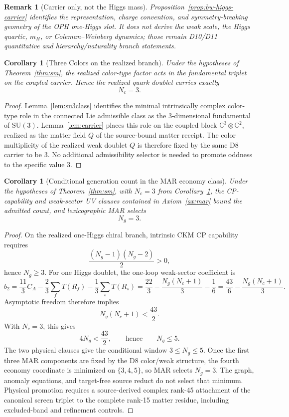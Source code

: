 \documentclass[11pt]{article}
\newtheorem{corollary}[theorem]{Corollary}
\newtheorem{remark}[theorem]{Remark}
\newcommand{\SU}{\mathrm{SU}}
\begin{document}
\begin{remark}[Carrier only, not the Higgs mass]
Proposition~\ref{prop:bw-higgs-carrier} identifies the representation, charge convention, and symmetry-breaking geometry of the OPH one-Higgs slot. It does not derive the weak scale, the Higgs quartic, \(m_H\), or Coleman--Weinberg dynamics; those remain D10/D11 quantitative and hierarchy/naturality branch statements.
\end{remark}

\begin{corollary}[Three Colors on the realized branch]\label{cor:nc}
Under the hypotheses of Theorem~\ref{thm:sm}, the realized color-type factor acts in the fundamental triplet on the coupled carrier. Hence the realized quark doublet carries exactly
\[
N_c=3.
\]
\end{corollary}

\begin{proof}
Lemma~\ref{lem:su3class} identifies the minimal intrinsically complex color-type role in the connected Lie admissible class as the \(3\)-dimensional fundamental of \(\SU(3)\). Lemma~\ref{lem:carrier} places this role on the coupled block \(\mathbb C^3\otimes\mathbb C^2\), realized as the matter field \(Q\) of the source-bound matter receipt. The color multiplicity of the realized weak doublet \(Q\) is therefore fixed by the same D8 carrier to be \(3\). No additional admissibility selector is needed to promote oddness to the specific value \(3\).
\end{proof}

\begin{corollary}[Conditional generation count in the MAR economy class]\label{cor:ng}
Under the hypotheses of Theorem~\ref{thm:sm}, with \(N_c=3\) from Corollary~\ref{cor:nc}, the CP-capability and weak-sector UV clauses contained in Axiom~\ref{ax:mar} bound the admitted count, and lexicographic MAR selects
\[
N_g=3.
\]
\end{corollary}

\begin{proof}
On the realized one-Higgs chiral branch, intrinsic CKM CP capability requires
\[
\frac{(N_g-1)(N_g-2)}{2}>0,
\]
hence $N_g\ge 3$. For one Higgs doublet, the one-loop weak-sector coefficient is
\[
b_2=\frac{11}{3}C_A-\frac{2}{3}\sum_f T(R_f)-\frac{1}{3}\sum_s T(R_s)
=
\frac{22}{3}-\frac{N_g(N_c+1)}{3}-\frac16
=
\frac{43}{6}-\frac{N_g(N_c+1)}{3}.
\]
Asymptotic freedom therefore implies
\[
N_g(N_c+1)<\frac{43}{2}.
\]
With \(N_c=3\), this gives
\[
4N_g<\frac{43}{2},
\qquad\text{hence}\qquad
N_g\le 5.
\]
The two physical clauses give the conditional window \(3\le N_g\le5\).
Once the first three MAR components are fixed by the D8 color/weak structure,
the fourth economy coordinate is minimized on \(\{3,4,5\}\), so MAR selects
\(N_g=3\). The graph, anomaly equations, and target-free source reduct do not
select that minimum. Physical promotion requires a source-derived complex
rank-45 attachment of the canonical screen triplet to the complete rank-15
matter residue, including excluded-band and refinement controls.
\end{proof}
\end{document}
